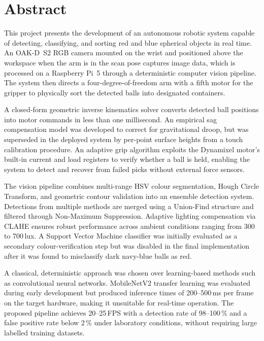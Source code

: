 \clearpage
\thispagestyle{empty}
{}
\section*{Abstract}

\vspace{0.5cm}

This project presents the development of an autonomous robotic system capable of 
detecting, classifying, and sorting red and blue spherical objects in real time. 
An OAK-D~S2 RGB camera mounted on the wrist and positioned above the workspace 
when the arm is in the scan pose captures image data, which is processed on a 
Raspberry Pi~5 through a deterministic computer vision pipeline. The system then 
directs a four-degree-of-freedom arm with a fifth motor for the gripper to 
physically sort the detected balls into designated containers.

\vspace{0.4cm}

A closed-form geometric inverse kinematics solver converts
detected ball positions into motor commands in less than one
millisecond. An empirical sag compensation model was developed
to correct for gravitational droop, but was superseded in the
deployed system by per-point surface heights from a touch
calibration procedure. An adaptive grip algorithm exploits the
Dynamixel motor's built-in current and load registers to verify
whether a ball is held, enabling the system to detect and
recover from failed picks without external force sensors.

\vspace{0.4cm}

The vision pipeline combines multi-range HSV colour segmentation, Hough Circle 
Transform, and geometric contour validation into an ensemble detection system. 
Detections from multiple methods are merged using a Union-Find structure and 
filtered through Non-Maximum Suppression. Adaptive lighting compensation via 
CLAHE ensures robust performance across ambient conditions ranging from 
300 to 700\,lux. A Support Vector Machine classifier was initially evaluated 
as a secondary colour-verification step but was disabled in the final 
implementation after it was found to misclassify dark navy-blue balls as red.

\vspace{0.4cm}

A classical, deterministic approach was chosen over learning-based methods such 
as convolutional neural networks. MobileNetV2 transfer learning was evaluated 
during early development but produced inference times of 200--500\,ms per frame 
on the target hardware, making it unsuitable for real-time operation. The 
proposed pipeline achieves 20--25\,FPS with a detection rate of 98--100\,\% 
and a false positive rate below 2\,\% under laboratory conditions, without 
requiring large labelled training datasets.

